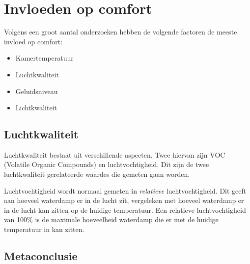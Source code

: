 
\section{Invloeden op comfort} \label{sec:theory}
Volgens een groot aantal onderzoeken hebben de volgende factoren de meeste invloed op comfort\cite{comfort-grootheden}:
\begin{itemize}
    \item Kamertemperatuur
    \item Luchtkwaliteit
    \item Geluidsniveau
    \item Lichtkwaliteit
\end{itemize}

\subsection{Luchtkwaliteit}
Luchtkwaliteit bestaat uit verschillende aspecten. Twee hiervan zijn VOC (Volatile Organic Compounds) en luchtvochtigheid\cite{comfort-grootheden}\cite{luchtkwal-is-voc-denk-ik-misschien}. Dit zijn de twee luchtkwaliteit gerelateerde waardes die gemeten gaan worden.

Luchtvochtigheid wordt normaal gemeten in \textit{relatieve} luchtvochtigheid. Dit geeft aan hoeveel waterdamp er in de lucht zit, vergeleken met hoeveel waterdamp er in de lucht kan zitten op de huidige temperatuur. Een relatieve luchtvochtigheid van 100\% is de maximale hoeveelheid waterdamp die er met de huidige temperatuur in kan zitten. 


\subsection{Metaconclusie}


